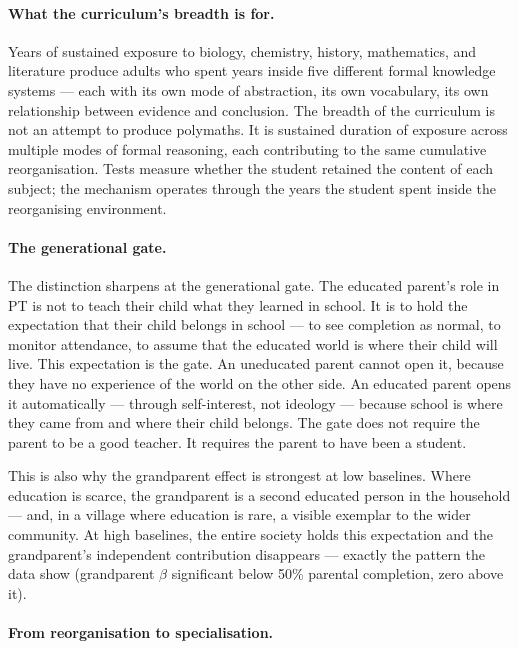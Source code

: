 \documentclass[12pt,letterpaper]{article}
\begin{document}
\paragraph{What the curriculum's breadth is for.}

Years of sustained exposure to biology, chemistry, history,
mathematics, and literature produce adults who spent years inside
five different formal knowledge systems --- each with its own mode of
abstraction, its own vocabulary, its own relationship between
evidence and conclusion. The breadth of the curriculum is not an
attempt to produce polymaths. It is sustained duration of exposure
across multiple modes of formal reasoning, each contributing to the
same cumulative reorganisation. Tests measure whether the student
retained the content of each subject; the mechanism operates through
the years the student spent inside the reorganising environment.

\paragraph{The generational gate.}

The distinction sharpens at the generational gate. The educated parent's
role in PT is not to teach their child what they learned in school. It is
to hold the expectation that their child belongs in school --- to see
completion as normal, to monitor attendance, to assume that the educated
world is where their child will live. This expectation is the gate. An
uneducated parent cannot open it, because they have no experience of the
world on the other side. An educated parent opens it automatically ---
through self-interest, not ideology --- because school is where they came
from and where their child belongs. The gate does not require the parent
to be a good teacher. It requires the parent to have been a student.

This is also why the grandparent effect is strongest at low baselines.
Where education is scarce, the grandparent is a second educated person
in the household --- and, in a village where education is rare, a visible
exemplar to the wider community. At high baselines, the entire society
holds this expectation and the grandparent's independent contribution
disappears --- exactly the pattern the data show (grandparent $\beta$
significant below 50\% parental completion, zero above it).

\paragraph{From reorganisation to specialisation.}
\end{document}
